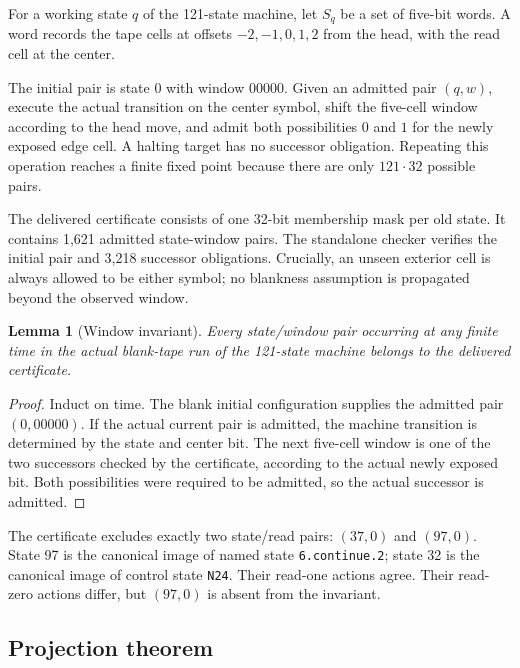 \documentclass[10pt]{article}
\newtheorem{lemma}[theorem]{Lemma}
\theoremstyle{definition}
\begin{document}
For a working state $q$ of the 121-state machine, let $S_q$ be a set of
five-bit words. A word records the tape cells at offsets $-2,-1,0,1,2$ from
the head, with the read cell at the center.

The initial pair is state $0$ with window $00000$. Given an admitted pair
$(q,w)$, execute the actual transition on the center symbol, shift the
five-cell window according to the head move, and admit both possibilities $0$
and $1$ for the newly exposed edge cell. A halting target has no successor
obligation. Repeating this operation reaches a finite fixed point because
there are only $121\cdot32$ possible pairs.

The delivered certificate consists of one 32-bit membership mask per old
state. It contains 1,621 admitted state-window pairs. The standalone checker
verifies the initial pair and 3,218 successor obligations. Crucially, an
unseen exterior cell is always allowed to be either symbol; no blankness
assumption is propagated beyond the observed window.

\begin{lemma}[Window invariant]
\label{lem:window}
Every state/window pair occurring at any finite time in the actual blank-tape
run of the 121-state machine belongs to the delivered certificate.
\end{lemma}

\begin{proof}
Induct on time. The blank initial configuration supplies the admitted pair
$(0,00000)$. If the actual current pair is admitted, the machine transition is
determined by the state and center bit. The next five-cell window is one of
the two successors checked by the certificate, according to the actual newly
exposed bit. Both possibilities were required to be admitted, so the actual
successor is admitted.
\end{proof}

The certificate excludes exactly two state/read pairs: $(37,0)$ and $(97,0)$.
State 97 is the canonical image of named state \texttt{6.continue.2}; state 32
is the canonical image of control state \texttt{N24}. Their read-one actions
agree. Their read-zero actions differ, but $(97,0)$ is absent from the
invariant.

\subsection{Projection theorem}
\end{document}
